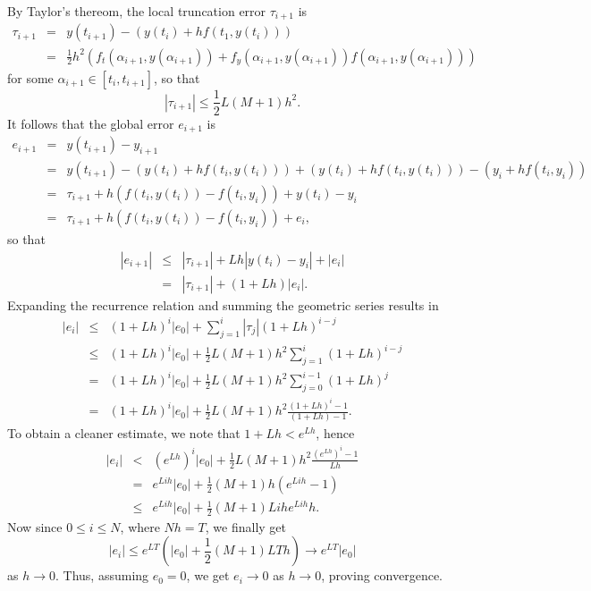 \documentclass{article}
\begin{document}
\begin{enumerate}
\begin{enumerate}
By Taylor's thereom, the local truncation error \(\tau_{i + 1}\) is
\begin{eqnarray*}
\tau_{i + 1} & = & y(t_{i + 1}) - \left( y(t_i) + hf(t_1,y(t_i)) \right) \\
             & = & \frac{1}{2} h^2 \left( f_t(\alpha_{i + 1}, y(\alpha_{i + 1})) + f_y(\alpha_{i + 1}, y(\alpha_{i + 1})) f(\alpha_{i + 1}, y(\alpha_{i + 1})) \right)
\end{eqnarray*}
for some \(\alpha_{i + 1} \in [t_i, t_{i + 1}]\), so that
\[|\tau_{i + 1}| \leq \frac{1}{2} L (M + 1) h^2.\]
It follows that the global error \(e_{i + 1}\) is
\begin{eqnarray*}
e_{i + 1} & = & y(t_{i + 1}) - y_{i + 1} \\
          & = & y(t_{i + 1}) - (y(t_i) + h f(t_i,y(t_i))) + (y(t_i) + h f(t_i,y(t_i))) - (y_i + h f(t_i,y_i)) \\
          & = & \tau_{i + 1} + h \left( f(t_i,y(t_i)) - f(t_i,y_i) \right) + y(t_i) - y_i \\
          & = & \tau_{i + 1} + h \left( f(t_i,y(t_i)) - f(t_i,y_i) \right) + e_i,
\end{eqnarray*}
so that
\begin{eqnarray*}
|e_{i + 1}| & \leq & |\tau_{i + 1}| + L h |y(t_i) - y_i| + |e_i| \\
            &   =  & |\tau_{i + 1}| + (1 + Lh) |e_i|.
\end{eqnarray*}
Expanding the recurrence relation and summing the geometric series results in
\begin{eqnarray*}
|e_i| & \leq & (1 + Lh)^i |e_0| + \sum_{j = 1}^i |\tau_j| (1 + Lh)^{i - j} \\
      & \leq & (1 + Lh)^i |e_0| + \frac{1}{2} L (M + 1) h^2 \sum_{j = 1}^i (1 + Lh)^{i - j} \\
      &   =  & (1 + Lh)^i |e_0| + \frac{1}{2} L (M + 1) h^2 \sum_{j = 0}^{i - 1} (1 + Lh)^j \\
      &   =  & (1 + Lh)^i |e_0| + \frac{1}{2} L (M + 1) h^2 \frac{(1 + Lh)^i - 1}{(1 + Lh) - 1}.
\end{eqnarray*}
To obtain a cleaner estimate, we note that \(1 + Lh < e^{Lh}\), hence
\begin{eqnarray*}
|e_i| &   <  & \left( e^{Lh} \right)^i |e_0| + \frac{1}{2} L (M + 1) h^2 \frac{\left( e^{Lh} \right)^i - 1}{Lh} \\
      &   =  & e^{Lih} |e_0| + \frac{1}{2} (M + 1) h \left( e^{Lih} - 1 \right) \\
      & \leq & e^{Lih} |e_0| + \frac{1}{2} (M + 1) Lih e^{Lih} h.
\end{eqnarray*}
Now since \(0 \leq i \leq N\), where \(Nh = T\), we finally get
\[|e_i| \leq e^{LT} \left( |e_0| + \frac{1}{2} (M + 1) L T h \right) \to e^{LT} |e_0|\]
as \(h \to 0\).  Thus, assuming \(e_0 = 0\), we get \(e_i \to 0\) as \(h \to 0\), proving convergence.


\end{enumerate}
\end{enumerate}
\end{document}
